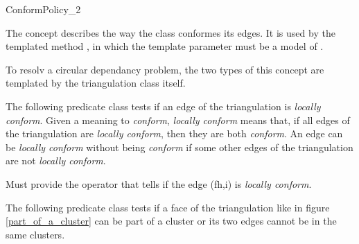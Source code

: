 \begin{ccRefConcept}{ConformPolicy_2}

\ccDefinition

The concept \ccRefName{} describes the way the
 class conformes its edges. It is
used by the templated method
, in which
the template parameter  must be a model of
\ccRefName{}.

To resolv a circular dependancy problem, the two types of this concept 
are templated by the triangulation class itself.

\ccTypes


The following predicate class tests if an edge of the triangulation is
\emph{locally conform}. Given a meaning to \emph{conform},
\emph{locally conform} means that, if all edges of the triangulation
are \emph{locally conform}, then they are both \emph{conform}. An edge
can be \emph{locally conform} without being \emph{conform} if some
other edges of the triangulation are not \emph{locally conform}.

 { Must provide
  the operator  that tells if the edge (fh,i) is \emph{locally conform}.}

The following predicate class tests if a face of the triangulation
like in figure \ref{part_of_a_cluster} can be part of a cluster or its 
two edges cannot be in the same clusters. 


\end{ccRefConcept}

